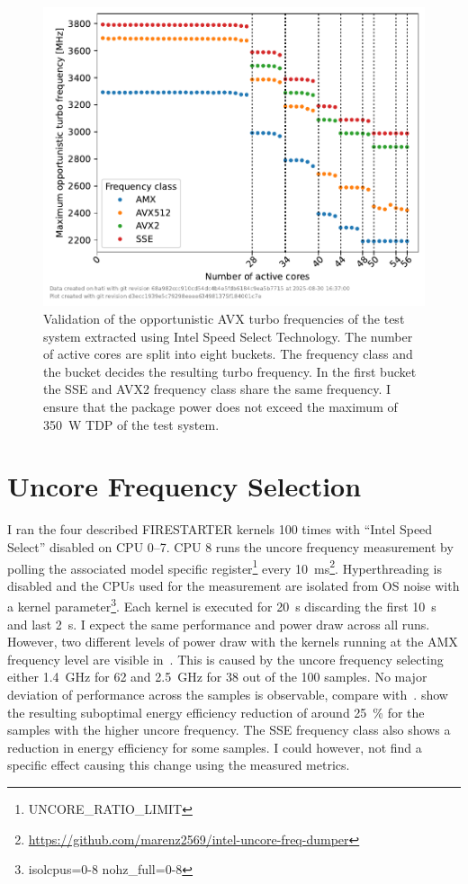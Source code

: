 \begin{figure}[]
    \centering
    \includegraphics[width=0.8\columnwidth]{fig/avx-frequency-license-bands-validation/validate-avx-frequency-license-bands.pdf}
    \caption{\label{fig:validated-p0n-frequencies}Validation of the opportunistic AVX turbo frequencies of the test system extracted using Intel Speed Select Technology.
    The number of active cores are split into eight buckets. The frequency class and the bucket decides the resulting turbo frequency.
    In the first bucket the SSE and AVX2 frequency class share the same frequency. I ensure that the package power does not exceed the maximum of \SI{350}{\watt} TDP of the test system.}
\end{figure}

\section{Uncore Frequency Selection}
\label{sec:avx-anomalies-uncore-freqency}

I ran the four described FIRESTARTER kernels \SI{100}{} times with ``Intel Speed Select'' disabled on CPU 0--7.
CPU 8 runs the uncore frequency measurement by polling the associated model specific register\footnote{UNCORE\_RATIO\_LIMIT} every \SI{10}{\ms}\footnote{\url{https://github.com/marenz2569/intel-uncore-freq-dumper}}.
Hyperthreading is disabled and the CPUs used for the measurement are isolated from OS noise with a kernel parameter\footnote{isolcpus=0-8 nohz\_full=0-8}.
Each kernel is executed for \SI{20}{\s} discarding the first \SI{10}{\s} and last \SI{2}{\s}.
I expect the same performance and power draw across all runs.
However, two different levels of power draw with the kernels running at the AMX frequency level are visible in~.
This is caused by the uncore frequency selecting either \SI{1.4}{\GHz} for \SI{62}{} and \SI{2.5}{\GHz} for \SI{38}{} out of the \SI{100}{} samples.
No major deviation of performance across the samples is observable, compare with~.
 show the resulting suboptimal energy efficiency reduction of around \SI{25}{\percent} for the samples with the higher uncore frequency.
The SSE frequency class also shows a reduction in energy efficiency for some samples.
I could however, not find a specific effect causing this change using the measured metrics.

